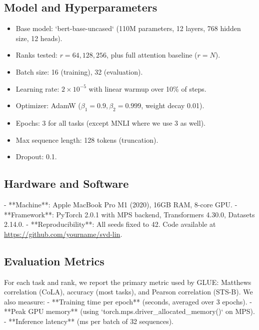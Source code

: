 \subsection{Model and Hyperparameters}
\begin{itemize}
    \item Base model: `bert-base-uncased` (110M parameters, 12 layers, 768 hidden size, 12 heads).
    \item Ranks tested: $r = 64, 128, 256$, plus full attention baseline ($r = N$).
    \item Batch size: 16 (training), 32 (evaluation).
    \item Learning rate: $2 \times 10^{-5}$ with linear warmup over 10\% of steps.
    \item Optimizer: AdamW ($\beta_1=0.9, \beta_2=0.999$, weight decay 0.01).
    \item Epochs: 3 for all tasks (except MNLI where we use 3 as well).
    \item Max sequence length: 128 tokens (truncation).
    \item Dropout: 0.1.
\end{itemize}

\subsection{Hardware and Software}
- **Machine**: Apple MacBook Pro M1 (2020), 16GB RAM, 8-core GPU.
- **Framework**: PyTorch 2.0.1 with MPS backend, Transformers 4.30.0, Datasets 2.14.0.
- **Reproducibility**: All seeds fixed to 42. Code available at \url{https://github.com/yourname/svd-lin}.

\subsection{Evaluation Metrics}
For each task and rank, we report the primary metric used by GLUE: Matthews correlation (CoLA), accuracy (most tasks), and Pearson correlation (STS-B). We also measure:
- **Training time per epoch** (seconds, averaged over 3 epochs).
- **Peak GPU memory** (using `torch.mps.driver\_allocated\_memory()` on MPS).
- **Inference latency** (ms per batch of 32 sequences).